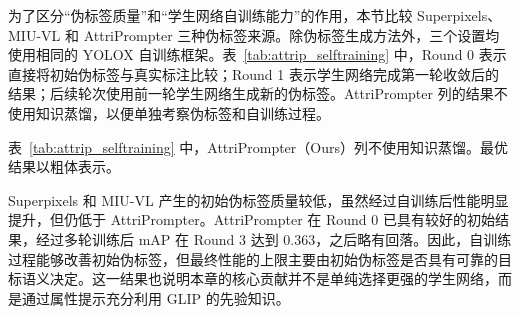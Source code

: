 为了区分“伪标签质量”和“学生网络自训练能力”的作用，本节比较 Superpixels、MIU-VL 和 AttriPrompter 三种伪标签来源。除伪标签生成方法外，三个设置均使用相同的 YOLOX 自训练框架。表~\ref{tab:attrip_selftraining} 中，Round 0 表示直接将初始伪标签与真实标注比较；Round 1 表示学生网络完成第一轮收敛后的结果；后续轮次使用前一轮学生网络生成新的伪标签。AttriPrompter 列的结果不使用知识蒸馏，以便单独考察伪标签和自训练过程。

\begin{table}[t]
\caption{不同伪标签的自训练结果}
\label{tab:attrip_selftraining}
\begin{center}
\end{center}
\vskip -0.15in
\end{table}
表~\ref{tab:attrip_selftraining} 中，AttriPrompter（Ours）列不使用知识蒸馏。最优结果以粗体表示。


Superpixels 和 MIU-VL 产生的初始伪标签质量较低，虽然经过自训练后性能明显提升，但仍低于 AttriPrompter。AttriPrompter 在 Round 0 已具有较好的初始结果，经过多轮训练后 mAP 在 Round 3 达到 0.363，之后略有回落。因此，自训练过程能够改善初始伪标签，但最终性能的上限主要由初始伪标签是否具有可靠的目标语义决定。这一结果也说明本章的核心贡献并不是单纯选择更强的学生网络，而是通过属性提示充分利用 GLIP 的先验知识。

